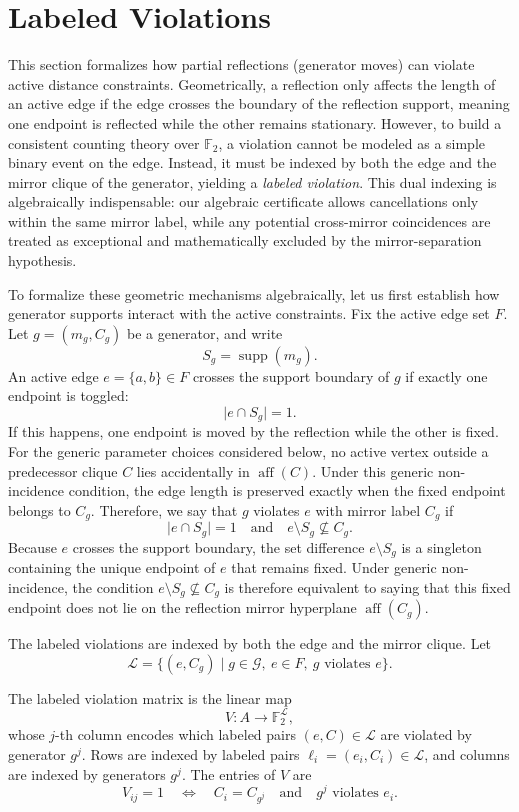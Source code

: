 \section{Labeled Violations}
\label{sec:violations}

This section formalizes how partial reflections (generator moves) can violate active distance constraints. 
Geometrically, a reflection only affects the length of an active edge if the edge crosses the boundary of the reflection support, meaning one endpoint is reflected while the other remains stationary. 
However, to build a consistent counting theory over $\mathbb{F}_2$, a violation cannot be modeled as a simple binary event on the edge. 
Instead, it must be indexed by both the edge and the mirror clique of the generator, yielding a \emph{labeled violation}. 
This dual indexing is algebraically indispensable: our algebraic certificate allows cancellations only within the same mirror label, while any potential cross-mirror coincidences are treated as exceptional and mathematically excluded by the mirror-separation hypothesis.

To formalize these geometric mechanisms algebraically, let us first establish how generator supports interact with the active constraints. Fix the active edge set $F$. Let $g=(m_g, C_g)$ be a generator, and write
\[
S_g = \operatorname{supp}(m_g).
\]
An active edge $e = \{a,b\} \in F$ crosses the support boundary of $g$ if exactly one endpoint is toggled:
\[
\lvert e \cap S_g \rvert = 1.
\]
If this happens, one endpoint is moved by the reflection while the other is fixed. For the generic parameter choices considered below, no active vertex outside a predecessor clique $C$ lies accidentally in $\operatorname{aff}(C)$. Under this generic non-incidence condition, the edge length is preserved exactly when the fixed endpoint belongs to $C_g$. Therefore, we say that $g$ violates $e$ with mirror label $C_g$ if
\[
\lvert e \cap S_g \rvert = 1
\quad\text{and}\quad
e\setminus S_g \not\subseteq C_g.
\]
Because $e$ crosses the support boundary, the set difference $e \setminus S_g$ is a singleton containing the unique endpoint of $e$ that remains fixed. Under generic non-incidence, the condition $e \setminus S_g \not\subseteq C_g$ is therefore equivalent to saying that this fixed endpoint does not lie on the reflection mirror hyperplane $\operatorname{aff}(C_g)$.

The labeled violations are indexed by both the edge and the mirror clique. Let
\[
\mathcal{L}
=
\{(e, C_g) \mid g \in \mathcal{G},\ e \in F,\ g \text{ violates } e\}.
\]
\begin{definition}
\label{def:violation-matrix}
The labeled violation matrix is the linear map
\[
V: A \to \mathbb{F}_2^{\mathcal{L}},
\]
whose $j$-th column encodes which labeled pairs $(e,C)\in\mathcal{L}$ are violated by generator $g^j$.
Rows are indexed by labeled pairs $\ell_i=(e_i,C_i)\in\mathcal{L}$, and columns are indexed by generators $g^j$. The entries of $V$ are
\[
V_{ij} = 1
\quad\Longleftrightarrow\quad
C_i = C_{g^j} \quad\text{and}\quad g^j \text{ violates } e_i.
\]
\end{definition}


